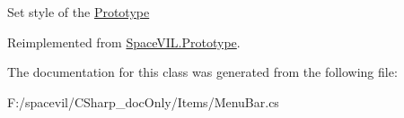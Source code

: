 Set style of the \mbox{\hyperlink{class_space_v_i_l_1_1_prototype}{Prototype}} 



Reimplemented from \mbox{\hyperlink{class_space_v_i_l_1_1_prototype_ae96644a6ace490afb376fb542161e541}{Space\+V\+I\+L.\+Prototype}}.



The documentation for this class was generated from the following file\+:\begin{DoxyCompactItemize}
\item 
F\+:/spacevil/\+C\+Sharp\+\_\+doc\+Only/\+Items/Menu\+Bar.\+cs\end{DoxyCompactItemize}
